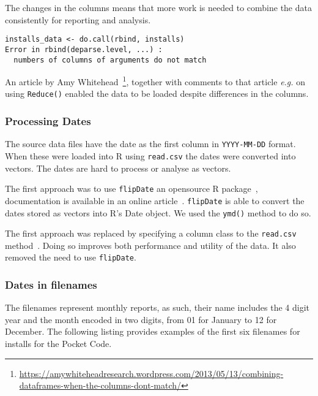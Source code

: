 The changes in the columns means that more work is needed to combine the data consistently for reporting and analysis. 

\begin{lstlisting}
installs_data <- do.call(rbind, installs)
Error in rbind(deparse.level, ...) : 
  numbers of columns of arguments do not match
\end{lstlisting}

An article by Amy Whitehead~\footnote{\url{https://amywhiteheadresearch.wordpress.com/2013/05/13/combining-dataframes-when-the-columns-dont-match/}}, together with comments to that article \emph{e.g.} on using \texttt{Reduce()} enabled the data to be loaded despite differences in the columns.

\subsubsection{Processing Dates}
The source data files have the date as the first column in \texttt{YYYY-MM-DD} format. When these were loaded into R using \texttt{read.csv} the dates were converted into vectors. The dates are hard to process or analyse as vectors. 

The first approach was to use \texttt{flipDate} an opensource R package~\cite{r_date_conversion_github}, documentation is available in an online article~\cite{r_date_conversion_article}. \texttt{flipDate} is able to convert the dates stored as vectors into R's Date object. We used the \texttt{ymd()} method to do so.

The first approach was replaced by specifying a column class to the \texttt{read.csv} method~\cite{r_bloggers_using_colclasses}. Doing so improves both performance and utility of the data. It also removed the need to use \texttt{flipDate}.

\subsubsection{Dates in filenames}
The filenames represent monthly reports, as such, their name includes the 4 digit year and the month encoded in two digits, from 01 for January to 12 for December. The following listing provides examples of the first six filenames for installs for the Pocket Code.

\begin{comment}


\begin{lstlisting}
head(install_filenames)
[1] "installs_org.catrobat.catroid_201308_overview.csv"
[2] "installs_org.catrobat.catroid_201309_overview.csv"
[3] "installs_org.catrobat.catroid_201310_overview.csv"
[4] "installs_org.catrobat.catroid_201311_overview.csv"
[5] "installs_org.catrobat.catroid_201312_overview.csv"
[6] "installs_org.catrobat.catroid_201401_overview.csv"
\end{lstlisting}

\end{comment}

